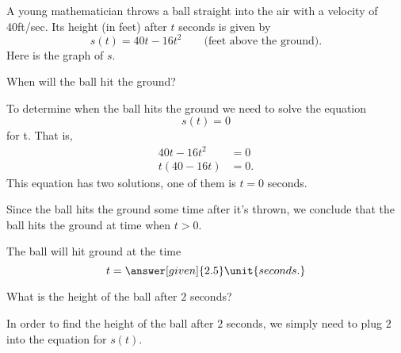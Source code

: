 \documentclass{ximera}
\begin{document}
\begin{example}
A young mathematician throws a ball straight into the air with 
a velocity of 40ft/sec. Its height (in feet) after $t$ seconds 
is given by
\[
s(t) = 40t-16t^2 \qquad\text{(feet above the ground)} .
\]
Here is the graph of $s$.
\begin{image}
\end{image}

\begin{question}
	When will the ball hit the ground?
	
		\begin{explanation}
			To determine when the ball hits the ground we need to solve the equation
			\[ s(t)=0 \]
			for t.  That is,
			\begin{align*}
			40t-16t^2 &= 0\\
			t(40-16t) &= 0.
			\end{align*}
			This  equation has two solutions, one of them is $t=0$
			seconds.
			 
			   Since the ball hits
			the ground  some time after it's
			thrown, we conclude that the ball hits the ground at time when $t>0$.
		
			The ball will hit ground at the time
			\[ t=\answer[given]{2.5} \unit{seconds.} \]
		\end{explanation}

\end{question}


\begin{question}
	What is the height of the ball after $2$ seconds?
	
	\begin{explanation}
		In order to find the height of the ball after $2$ seconds, we simply need 
		to plug $2$ into the equation for $s(t)$.
	

\end{explanation}
\end{question}
\end{example}
\end{document}
